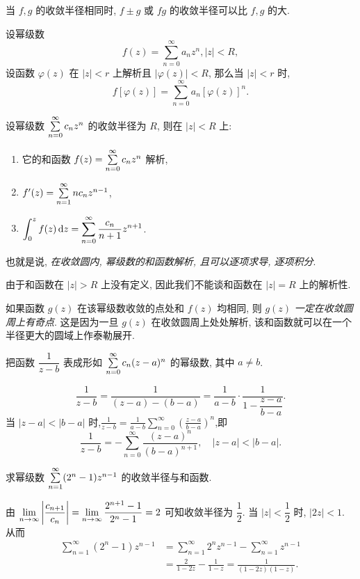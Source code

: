 当 $f,g$ 的收敛半径相同时, $f\pm g$ 或 $fg$ 的收敛半径可以比 $f,g$ 的大.

\begin{theorem}
	设幂级数
	\[f(z)=\sum_{n=0}^\infty a_nz^n,|z|<R,\]
	设函数 $\varphi(z)$ 在 $|z|<r$ 上解析且 $|\varphi(z)|<R$, 
	{那么当 $|z|<r$ 时,
	\[f[\varphi(z)]=\sum_{n=0}^\infty a_n[\varphi(z)]^n.\]}
\end{theorem}

\begin{theorem}
	设幂级数 $\sum\limits_{n=0}^\infty c_nz^n$ 的收敛半径为 $R$, 则在 $|z|<R$ 上:
	\begin{enumerate}
		\item 它的和函数 $f(z)=\sum\limits_{n=0}^\infty c_nz^n$ 解析,
		\item $f'(z)=\sum\limits_{n=1}^\infty nc_nz^{n-1}$,
		\item $\displaystyle\int_0^zf(z)\,\mathrm{d} z=\sum_{n=0}^\infty \frac{c_n}{n+1}z^{n+1}$.
	\end{enumerate}
\end{theorem}

也就是说, \emph{在收敛圆内, 幂级数的和函数解析, 且可以逐项求导, 逐项积分}.

由于和函数在 $|z|>R$ 上没有定义, 因此我们不能谈和函数在 $|z|=R$ 上的解析性.

如果函数 $g(z)$ 在该幂级数收敛的点处和 $f(z)$ 均相同, 则 $g(z)$ \emph{一定在收敛圆周上有奇点}.
这是因为一旦 $g(z)$ 在收敛圆周上处处解析, 该和函数就可以在一个半径更大的圆域上作泰勒展开.

\begin{example}
	把函数 $\dfrac1{z-b}$ 表成形如 $\sum\limits_{n=0}^\infty c_n(z-a)^n$ 的幂级数, 其中 $a\neq b$.
\end{example}

\begin{solution}
	\[\frac1{z-b}=\frac1{(z-a)-(b-a)}
	{=\frac1{a-b}\cdot\frac1{1-\dfrac{z-a}{b-a}}.}\]
	{当 $|z-a|<|b-a|$ 时,$\displaystyle\frac1{z-b}=\frac1{a-b}\sum_{n=0}^\infty\left(\frac{z-a}{b-a}\right)^n$,即
	\[\frac1{z-b}=-\sum_{n=0}^\infty\frac{(z-a)^n}{(b-a)^{n+1}},\quad|z-a|<|b-a|.\]}
\end{solution}

\begin{example}
	求幂级数 $\sum\limits_{n=1}^\infty(2^n-1)z^{n-1}$ 的收敛半径与和函数.
\end{example}

\begin{solution}
	由 $\displaystyle\lim_{n\to\infty}\left|\frac{c_{n+1}}{c_n}\right|=\lim_{n\to\infty}\frac{2^{n+1}-1}{2^n-1}=2$ 可知收敛半径为 $\dfrac12$.
	{当 $|z|<\dfrac12$ 时, $|2z|<1$.}
	{从而
	\begin{align*}
	\sum_{n=1}^\infty(2^n-1)z^{n-1}&=\sum_{n=1}^\infty 2^n z^{n-1}-\sum_{n=1}^\infty z^{n-1}\\
	&{=\frac2{1-2z}-\frac1{1-z}=\frac1{(1-2z)(1-z)}.}
	\end{align*}}
\end{solution}

